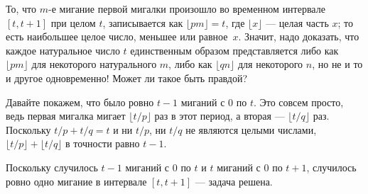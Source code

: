 То, что $m$-е мигание первой мигалки произошло во временном интервале $[t, t + 1]$ при целом $t$,
записывается как $\lfloor pm\rfloor = t$, где $\lfloor x\rfloor$ — целая часть $x$; то есть наибольшее целое число, меньшее или равное~$x$.
Значит, надо доказать, что каждое натуральное число $t$ единственным образом представляется либо как $\lfloor pm\rfloor$ для некоторого натурального $m$, либо как $\lfloor qn\rfloor$ для некоторого $n$, но не и то и другое одновременно!
Может ли такое быть правдой?



Давайте покажем, что было ровно $t - 1$ миганий с $0$ по $t$.
Это совсем просто, ведь первая мигалка мигает $\lfloor t/p\rfloor$ раз в этот период, а вторая --- $\lfloor t/q\rfloor$ раз.
Поскольку $t/p + t/q = t$ и ни $t/p$, ни $t/q$ не являются целыми числами, $\lfloor t/p\rfloor + \lfloor t/q\rfloor$ в точности равно $t - 1$.

Поскольку случилось $t - 1$ миганий с $0$ по $t$ и $t$ миганий с $0$ по $t+1$, случилось ровно одно мигание в интервале $[t,t+1]$ --- задача решена.


%
%
%
%
%
%



